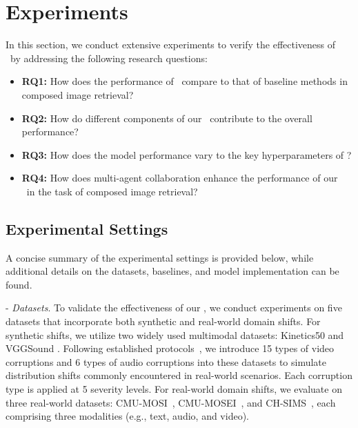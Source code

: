 \section{Experiments}
\label{sec:experiments}






In this section, we conduct extensive experiments to verify the effectiveness of \M~by addressing the following research questions: 

\begin{itemize}[leftmargin=*]

\item \textbf{RQ1:} How does the performance of \M~compare to that of baseline methods in composed image retrieval?


\item \textbf{RQ2:} How do different components of our \M~contribute to the overall performance?

\item \textbf{RQ3:} How does the model performance vary to the key hyperparameters of \M?

\item \textbf{RQ4:} How does multi-agent collaboration enhance the performance of our \M~in the task of composed image retrieval?


\end{itemize} 

\subsection{Experimental Settings}\label{sec:settings}

A concise summary of the experimental settings is provided below, while additional details on the datasets, baselines, and model implementation can be found.

\noindent - \textit{Datasets}. To validate the effectiveness of our \M, we conduct experiments on five datasets that incorporate both synthetic and real-world domain shifts. For synthetic shifts, we utilize two widely used multimodal datasets: Kinetics50 \cite{kay2017kinetics} and VGGSound \cite{chen2020vggsound}. Following established protocols~\cite{yang2024test,Lee2024Entropy}, we introduce 15 types of video corruptions and 6 types of audio corruptions into these datasets to simulate distribution shifts commonly encountered in real-world scenarios. Each corruption type is applied at 5 severity levels. For real-world domain shifts, we evaluate on three real-world datasets: CMU-MOSI~\cite{zadeh2016multimodal}, CMU-MOSEI~\cite{zadeh2018multimodal}, and CH-SIMS~\cite{yu2020ch}, each comprising three modalities (e.g., text, audio, and video).


